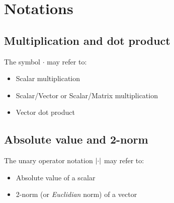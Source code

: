\section{Notations}
\subsection{Multiplication and dot product}
The symbol $\cdot$ may refer to:
\begin{itemize}
\item Scalar multiplication
\item Scalar/Vector or Scalar/Matrix multiplication
\item Vector dot product
\end{itemize}

\subsection{Absolute value and 2-norm}
The unary operator notation $\abs{\cdot}$ may refer to:
\begin{itemize}
\item Absolute value of a scalar
\item 2-norm (or \emph{Euclidian} norm) of a vector
\end{itemize}
